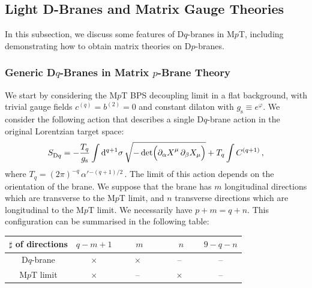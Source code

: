 \documentclass[11pt]{article}
\newcommand{\be}{\begin{equation}}
\newcommand{\ee}{\end{equation}}
\newcommand{\p}{\partial}
\newcommand{\dd}{\mathrm{d}}
\begin{document}
\subsection{Light D-Branes and Matrix Gauge Theories}
\label{sec:dmgt} 

In this subsection, we discuss some features of D$q$-branes in M$p$T, including demonstrating how to obtain matrix theories on D$p$-branes.

\subsubsection{Generic D\texorpdfstring{$q$}{q}-Branes in Matrix \texorpdfstring{$p$}{p}-Brane Theory} \label{sec:gdbmpt}

We start by considering the M$p$T BPS decoupling limit in a flat background, with trivial gauge fields $c^{(q)} = b^{(2)} = 0$ and constant dilaton with $g^{}_\text{s} \equiv e^{\varphi}$.
We consider the following action that describes a single D$q$-brane action in the original Lorentzian target space:
%
\be \label{eq:sdpba}
    S^{}_\text{D$q$} = - \frac{T_q}{g_\text{s}} \int \dd^{q+1} \sigma \, \sqrt{-\det \Bigl( \p_{\alpha} X^\mu_{\phantom{\dagger}} \, \p_{\beta} X_\mu \Bigr)} + T_q \int C^{(q+1)}\,,
\ee
%
where $T_q = (2\pi)^{-q} \, \alpha'{}^{-(q+1)/2}$\,. 
The limit of this action depends on the orientation of the brane. 
We suppose that the brane has $m$ longitudinal directions which are transverse to the M$p$T limit, and $n$ transverse directions which are longitudinal to the M$p$T limit.
We necessarily have $p+m=q+n$.
This configuration can be summarised in the following table:
%
\begin{center}
\begin{tabular}{c|c|c|c|c}
$\sharp$ of directions & $q-m+1$ & \,$\phantom{q-}m\phantom{-q}$\, & \,$\phantom{q-}n\phantom{-q}$\, & $9 - q - n$ \\[2pt]
\hline 
D$q$-brane & $\times$ & $\times$ & -- & -- \\[2pt]
M$p$T limit & $\times$ & -- & $\times$ & -- 
\end{tabular}
\end{center}
\end{document}
